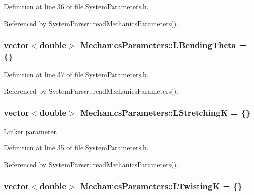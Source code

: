 Definition at line 36 of file System\+Parameters.\+h.



Referenced by System\+Parser\+::read\+Mechanics\+Parameters().

\hypertarget{structMechanicsParameters_aab9d6facd9ba3939017117cd5bff60db}{
\subsubsection[{L\+Bending\+Theta}]{\setlength{\rightskip}{0pt plus 5cm}vector$<$double$>$ Mechanics\+Parameters\+::\+L\+Bending\+Theta = \{\}}}\label{structMechanicsParameters_aab9d6facd9ba3939017117cd5bff60db}


Definition at line 37 of file System\+Parameters.\+h.



Referenced by System\+Parser\+::read\+Mechanics\+Parameters().

\hypertarget{structMechanicsParameters_aea1e85562167210db74aa3ffd0013bd7}{
\subsubsection[{L\+Stretching\+K}]{\setlength{\rightskip}{0pt plus 5cm}vector$<$double$>$ Mechanics\+Parameters\+::\+L\+Stretching\+K = \{\}}}\label{structMechanicsParameters_aea1e85562167210db74aa3ffd0013bd7}


\hyperlink{classLinker}{Linker} parameter. 



Definition at line 35 of file System\+Parameters.\+h.



Referenced by System\+Parser\+::read\+Mechanics\+Parameters().

\hypertarget{structMechanicsParameters_a6629c1138e0a0662f6156fe67431f690}{
\subsubsection[{L\+Twisting\+K}]{\setlength{\rightskip}{0pt plus 5cm}vector$<$double$>$ Mechanics\+Parameters\+::\+L\+Twisting\+K = \{\}}}\label{structMechanicsParameters_a6629c1138e0a0662f6156fe67431f690}


